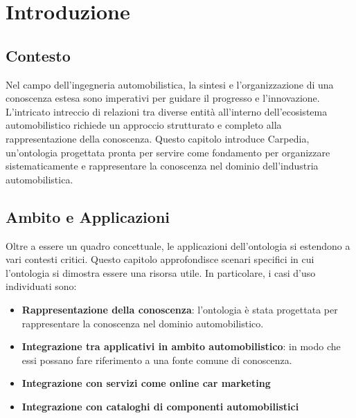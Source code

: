 \chapter{Introduzione}

\section{Contesto}
Nel campo dell'ingegneria automobilistica, la sintesi e l'organizzazione di una conoscenza estesa sono imperativi per guidare il progresso e l'innovazione. L'intricato intreccio di relazioni tra diverse entità all'interno dell'ecosistema automobilistico richiede un approccio strutturato e completo alla rappresentazione della conoscenza. Questo capitolo introduce Carpedia, un'ontologia progettata pronta per servire come fondamento per organizzare sistematicamente e rappresentare la conoscenza nel dominio dell'industria automobilistica.

\section{Ambito e Applicazioni}
Oltre a essere un quadro concettuale, le applicazioni dell'ontologia si estendono a vari contesti critici. Questo capitolo approfondisce scenari specifici in cui l'ontologia si dimostra essere una risorsa utile. In particolare, i casi d'uso individuati sono:

\begin{itemize}
    \item \textbf{Rappresentazione della conoscenza}: l'ontologia è stata progettata per rappresentare la conoscenza nel dominio automobilistico.
    \item \textbf{Integrazione tra applicativi in ambito automobilistico}: in modo che essi possano fare riferimento a una fonte comune di conoscenza.
    \item \textbf{Integrazione con servizi come online car marketing}
    \item \textbf{Integrazione con cataloghi di componenti automobilistici}
\end{itemize}
